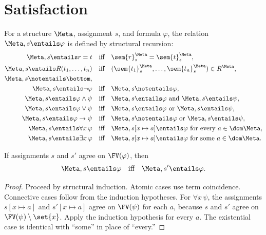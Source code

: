 \section{Satisfaction}
\label{sec:fol-semantics-02}

\begin{definition}[Satisfaction]
For a structure \(\Meta\), assignment \(s\), and formula \(\varphi\), the
relation \(\Meta,s\entails\varphi\) is defined by structural recursion:
\[
\begin{aligned}
 \Meta,s\entails r=t
 &\quad\text{iff}\quad
 \sem{r}^{\Meta}_s=\sem{t}^{\Meta}_s,\\
 \Meta,s\entails R(t_1,\ldots,t_n)
 &\quad\text{iff}\quad
 (\sem{t_1}^{\Meta}_s,\ldots,\sem{t_n}^{\Meta}_s)\in R^{\Meta},\\
 \Meta,s\notentails\bottom,
 &\\
 \Meta,s\entails\neg\varphi
 &\quad\text{iff}\quad\Meta,s\notentails\varphi,\\
 \Meta,s\entails\varphi\land\psi
 &\quad\text{iff}\quad
 \Meta,s\entails\varphi\text{ and }\Meta,s\entails\psi,\\
 \Meta,s\entails\varphi\lor\psi
 &\quad\text{iff}\quad
 \Meta,s\entails\varphi\text{ or }\Meta,s\entails\psi,\\
 \Meta,s\entails\varphi\to\psi
 &\quad\text{iff}\quad
 \Meta,s\notentails\varphi\text{ or }\Meta,s\entails\psi,\\
 \Meta,s\entails\forall x\,\varphi
 &\quad\text{iff}\quad
 \Meta,s[x\mapsto a]\entails\varphi
 \text{ for every }a\in\dom\Meta,\\
 \Meta,s\entails\exists x\,\varphi
 &\quad\text{iff}\quad
 \Meta,s[x\mapsto a]\entails\varphi
 \text{ for some }a\in\dom\Meta.
\end{aligned}
\]
\end{definition}

\begin{lemma}
\label{lem:fol-coincidence}
If assignments \(s\) and \(s'\) agree on \(\FV(\varphi)\), then
\[
 \Meta,s\entails\varphi
 \quad\text{iff}\quad
 \Meta,s'\entails\varphi.
\]
\end{lemma}
\begin{proof}
Proceed by structural induction.  Atomic cases use term coincidence.
Connective cases follow from the induction hypotheses.  For
\(\forall x\,\psi\), the assignments
\(s[x\mapsto a]\) and \(s'[x\mapsto a]\) agree on \(\FV(\psi)\) for each
\(a\), because \(s\) and \(s'\) agree on
\(\FV(\psi)\setminus\set{x}\).  Apply the induction hypothesis for every
\(a\).  The existential case is identical with ``some'' in place of
``every.''
\end{proof}

